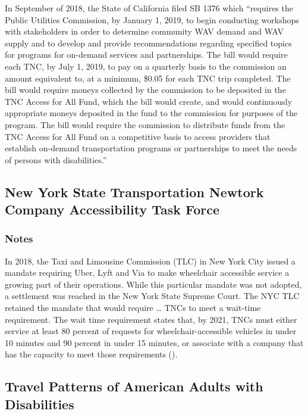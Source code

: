 \documentclass[
]{article}
\begin{document}
In September of 2018, the State of California filed SB 1376 which
``requires the Public Utilities Commission, by January 1, 2019, to begin
conducting workshops with stakeholders in order to determine community
WAV demand and WAV supply and to develop and provide recommendations
regarding specified topics for programs for on-demand services and
partnerships. The bill would require each TNC, by July 1, 2019, to pay
on a quarterly basis to the commission an amount equivalent to, at a
minimum, \$0.05 for each TNC trip completed. The bill would require
moneys collected by the commission to be deposited in the TNC Access for
All Fund, which the bill would create, and would continuously
appropriate moneys deposited in the fund to the commission for purposes
of the program. The bill would require the commission to distribute
funds from the TNC Access for All Fund on a competitive basis to access
providers that establish on-demand transportation programs or
partnerships to meet the needs of persons with disabilities.''

\hypertarget{new-york-state-transportation-newtork-company-accessibility-task-force}{%
\subsection{New York State Transportation Newtork Company Accessibility
Task
Force}\label{new-york-state-transportation-newtork-company-accessibility-task-force}}

\hypertarget{notes-26}{%
\subsubsection{Notes}\label{notes-26}}

In 2018, the Taxi and Limousine Commission (TLC) in New York City issued
a mandate requiring Uber, Lyft and Via to make wheelchair accessible
service a growing part of their operations. While this particular
mandate was not adopted, a settlement was reached in the New York State
Supreme Court. The NYC TLC retained the mandate that would require
\ldots{} TNCs to meet a wait-time requirement. The wait time requirement
states that, by 2021, TNCs must either service at least 80 percent of
requests for wheelchair-accessible vehicles in under 10 minutes and 90
percent in under 15 minutes, or associate with a company that has the
capacity to meet those requirements ().

\hypertarget{travel-patterns-of-american-adults-with-disabilities}{%
\subsection{Travel Patterns of American Adults with
Disabilities}\label{travel-patterns-of-american-adults-with-disabilities}}
\end{document}
